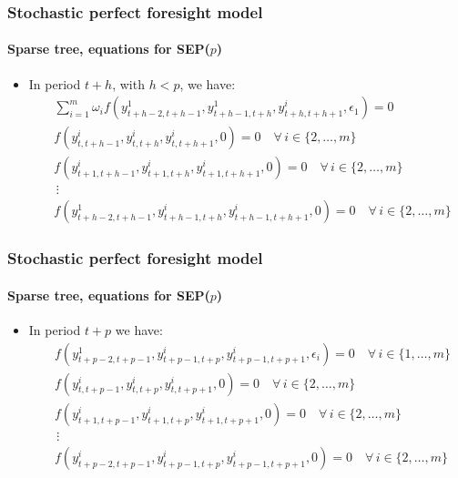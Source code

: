 \documentclass{beamer}
\begin{document}
\begin{frame}
   \frametitle{Stochastic perfect foresight model}
   \framesubtitle{Sparse tree, equations for SEP($p$)}

   \begin{itemize}

      \item In period $t+h$, with $h<p$, we have:
            \[
               \begin{split}
                   & \sum_{i=1}^m\omega_i f\left( y_{t+h-2,t+h-1}^1, y_{t+h-1,t+h}^1, y_{t+h, t+h+1}^i, \epsilon_1 \right) = 0      \\
                   & f\left(y_{t,t+h-1}^i, y_{t,t+h}^i, y_{t,t+h+1}^i, 0\right) = 0\quad \forall\, i\in\{2,\ldots,m\}               \\
                   & f\left(y_{t+1,t+h-1}^i, y_{t+1,t+h}^i, y_{t+1, t+h+1}^i, 0\right) = 0\quad \forall\, i\in\{2,\ldots,m\}        \\
                   & \,\vdots                                                                                                       \\
                   & f\left(y_{t+h-2,t+h-1}^1, y_{t+h-1,t+h}^i, y_{t+h-1,t+h+1}^i, 0 \right) = 0 \quad \forall\, i\in\{2,\ldots,m\}
               \end{split}
            \]

   \end{itemize}

\end{frame}


\begin{frame}
   \frametitle{Stochastic perfect foresight model}
   \framesubtitle{Sparse tree, equations for SEP($p$)}

   \begin{itemize}

      \item In period $t+p$ we have:
            \[
               \begin{split}
                   & f\left(y_{t+p-2,t+p-1}^1, y_{t+p-1,t+p}^i, y_{t+p-1,t+p+1}^i, \epsilon_i\right) = 0 \quad \forall\, i\in\{1,\ldots,m\} \\
                   & f\left(y_{t,t+p-1}^i, y_{t,t+p}^i, y_{t,t+p+1}^i, 0\right) = 0 \quad \forall\, i\in\{2,\ldots,m\}                      \\
                   & f\left(y_{t+1,t+p-1}^i, y_{t+1,t+p}^i, y_{t+1, t+p+1}^i, 0\right) = 0\quad \forall\, i\in\{2,\ldots,m\}                \\
                   & \,\vdots                                                                                                               \\
                   & f\left(y_{t+p-2,t+p-1}^i, y_{t+p-1,t+p}^i, y_{t+p-1,t+p+1}^i, 0 \right) = 0 \quad \forall\, i\in\{2,\ldots,m\}
               \end{split}
            \]

   \end{itemize}

\end{frame}
\end{document}
